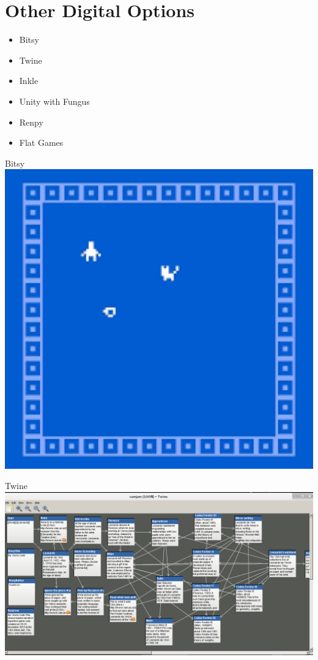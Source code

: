 \part{Other Digital Options}
\frame{\partpage}

\begin{frame}
	\begin{itemize}
		\item Bitsy
		\item Twine
		\item Inkle
		\item Unity with Fungus
		\item Renpy
		\item Flat Games
	\end{itemize}
\end{frame}

\begin{frame}{Bitsy}
	\includegraphics[width=1.0\textwidth, height=0.7\textheight]{bitsy}
\end{frame}

\begin{frame}{Twine}
	\includegraphics[width=1.0\textwidth]{twine}
\end{frame}

